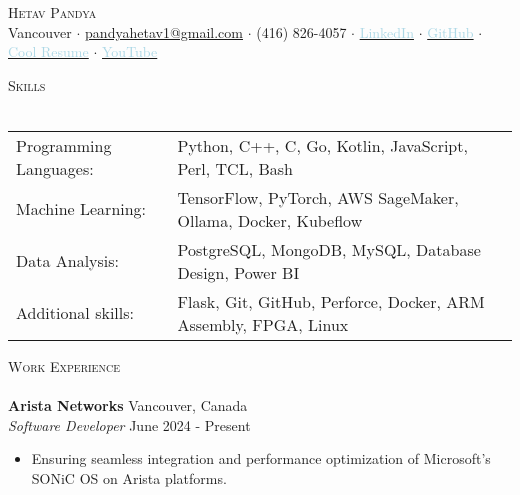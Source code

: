 \documentclass[a4paper]{article}
\newcommand{\lineunder} {
    \vspace*{-8pt} \\
    \hspace*{-18pt} \hrulefill \\
}
\newcommand{\header} [1] {
    {\hspace*{-18pt}\vspace*{6pt} \textsc{#1}}
    \vspace*{-6pt} \lineunder
}
\begin{document}
\vspace*{-50pt}



\vspace*{-10pt}
\begin{center}
	{\Huge \scshape {Hetav Pandya}}\\
	Vancouver $\cdot$ \href{mailto:pandyahetav1@gmail.com}{pandyahetav1@gmail.com} $\cdot$ (416) 826-4057 $\cdot$ \href{https://www.linkedin.com/in/hetav-pandya}{\textcolor{lightblue}{LinkedIn}} $\cdot$ \href{https://github.com/pandyah5}{\textcolor{lightblue}{GitHub}} $\cdot$ \href{https://pandyah5.github.io/terminalresume.github.io/}{\textcolor{lightblue}{Cool Resume}} $\cdot$ \href{https://www.youtube.com/channel/UCShTJOo9ywLntiM4cqOz-KA}{\textcolor{lightblue}{YouTube}}\\
\end{center}

\header{Skills}
\begin{small}
\begin{tabular}{ l l }
    Programming Languages: & Python, C++, C, Go, Kotlin, JavaScript, Perl, TCL, Bash             \\ 
	Machine Learning:      & TensorFlow, PyTorch, AWS SageMaker, Ollama, Docker, Kubeflow             \\
	Data Analysis:         & PostgreSQL, MongoDB, MySQL, Database Design, Power BI            \\
    Additional skills:     & Flask, Git, GitHub, Perforce, Docker, ARM Assembly, FPGA, Linux                      \\                               
\end{tabular}
\end{small}
\vspace{2mm}

\header{Work Experience}

\textbf{Arista Networks} \hfill Vancouver, Canada\\
\textit{Software Developer} \hfill June 2024 - Present\\
\vspace{-2.5mm}
\begin{itemize} \itemsep 1pt
    \item Ensuring seamless integration and performance optimization of Microsoft's SONiC OS on Arista platforms.
    \vspace{-1.5mm}
\end{itemize}
\end{document}
